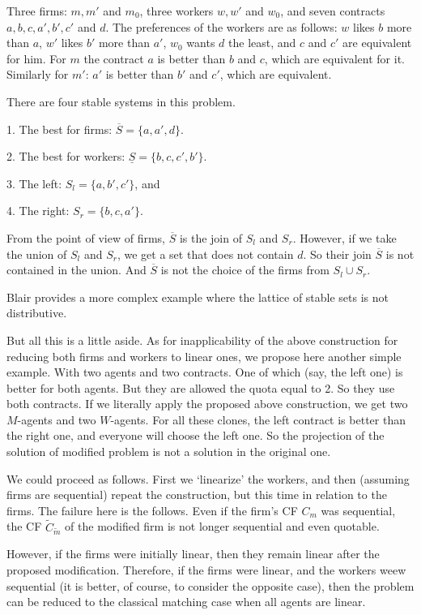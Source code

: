 \documentclass[12pt,a4paper]{article}
\begin{document}
Three firms: $m,m'$ and $m_0$, three workers $w,w'$ and $w_0$, and seven contracts $a,b, c, a',b', c'$ and $d$. The preferences of the workers are as follows: $w$ likes $b$ more than $a$, $w'$ likes $b'$ more than $a'$, $w_0$ wants $d$ the least, and $c$ and $c'$ are equivalent for him. For $m$ the contract $a$ is better than $b$ and $c$, which are equivalent for it. Similarly for $m'$: $a'$ is better than $b'$ and $c'$, which are equivalent.

           There are four stable systems in this problem.

           1. The best for firms: $\overline{S}=\{a,a',d\}$.

           2. The best for workers: $\underline{S}=\{b,c,c',b'\}$.

           3. The left: $S_l=\{a,b',c'\}$, and

           4. The right: $S_r=\{b,c,a'\}$.

From the point of view of firms, $\overline{S}$ is the join of $S_l$ and $S_r$. However, if we take the union of $S_l$ and $S_r$, we get a set that does not contain $d$. So their join $\overline{S}$ is not contained in the union. And $\overline{S}$ is not the choice of the firms from $S_l\cup S_r$.\medskip

Blair\cite{B} provides a more complex example where the lattice of stable sets is not distributive.

But all this is a little aside. As for inapplicability of the above construction for reducing both firms and workers to linear ones, we propose  here another simple example. With two agents and two contracts. One of which (say, the left one) is better for both agents. But they are allowed the quota equal to 2. So they use both contracts. If we literally apply the proposed above construction, we get two $M$-agents and two $W$-agents. For all these clones, the left contract is better than the right one, and everyone will choose the left one. So the projection of the solution of modified problem is not a solution in the original one.\medskip

We could proceed as follows. First we `linearize' the workers, and then
(assuming firms are sequential) repeat the construction, but this time in relation to the firms. The failure here is the follows. Even if the firm's CF $C_m$ was sequential, the CF $\widetilde C_{\widetilde m}$ of the modified firm is not longer sequential and even quotable.

However, if the firms were initially linear, then  they remain linear after the proposed modification. Therefore, if the firms were linear, and the workers weew sequential (it is better, of course, to consider the opposite case), then the problem can be reduced to the classical matching case when all agents are linear.
\end{document}
